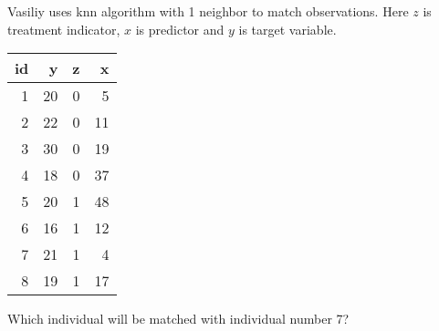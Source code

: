 
\begin{question}
Vasiliy uses knn algorithm with 1 neighbor to match observations.
Here \(z\) is treatment indicator, \(x\) is predictor and \(y\) is target variable.

\begin{longtable}[]{@{}rrrr@{}}
\toprule()
id & y & z & x \\
\midrule()
\endhead
1 & 20 & 0 & 5 \\
2 & 22 & 0 & 11 \\
3 & 30 & 0 & 19 \\
4 & 18 & 0 & 37 \\
5 & 20 & 1 & 48 \\
6 & 16 & 1 & 12 \\
7 & 21 & 1 & 4 \\
8 & 19 & 1 & 17 \\
\bottomrule()
\end{longtable}

Which individual will be matched with individual number 7?
\end{question}


